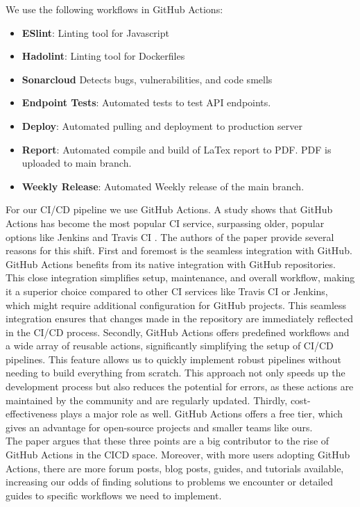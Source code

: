 \documentclass[11pt]{article}
\begin{document}
We use the following workflows in GitHub Actions:
\begin{itemize}
    \item \textbf{ESlint}: Linting tool for Javascript
    \item \textbf{Hadolint}: Linting tool for Dockerfiles
    \item \textbf{Sonarcloud} Detects bugs, vulnerabilities, and code smells
    \item \textbf{Endpoint Tests}: Automated tests to test API endpoints.
    \item \textbf{Deploy}: Automated pulling and deployment to production server
    \item \textbf{Report}: Automated compile and build of LaTex report to PDF. PDF is uploaded to main branch.
    \item \textbf{Weekly Release}: Automated Weekly release of the main branch.
\end{itemize}

For our CI/CD pipeline we use GitHub Actions. A study shows that GitHub Actions has become the most popular CI service, surpassing older, popular options like Jenkins and Travis CI \citep{github_actions_good}. The authors of the paper provide several reasons for this shift. First and foremost is the seamless integration with GitHub. GitHub Actions benefits from its native integration with GitHub repositories. This close integration simplifies setup, maintenance, and overall workflow, making it a superior choice compared to other CI services like Travis CI or Jenkins, which might require additional configuration for GitHub projects. This seamless integration ensures that changes made in the repository are immediately reflected in the CI/CD process. 
Secondly, GitHub Actions offers predefined workflows and a wide array of reusable actions, significantly simplifying the setup of CI/CD pipelines. This feature allows us to quickly implement robust pipelines without needing to build everything from scratch. This approach not only speeds up the development process but also reduces the potential for errors, as these actions are maintained by the community and are regularly updated.
Thirdly, cost-effectiveness plays a major role as well. GitHub Actions offers a free tier, which gives an advantage for open-source projects and smaller teams like ours. \\
The paper argues that these three points are a big contributor to the rise of GitHub Actions in the CI\/CD space. Moreover, with more users adopting GitHub Actions, there are more forum posts, blog posts, guides, and tutorials available, increasing our odds of finding solutions to problems we encounter or detailed guides to specific workflows we need to implement. 
\end{document}
